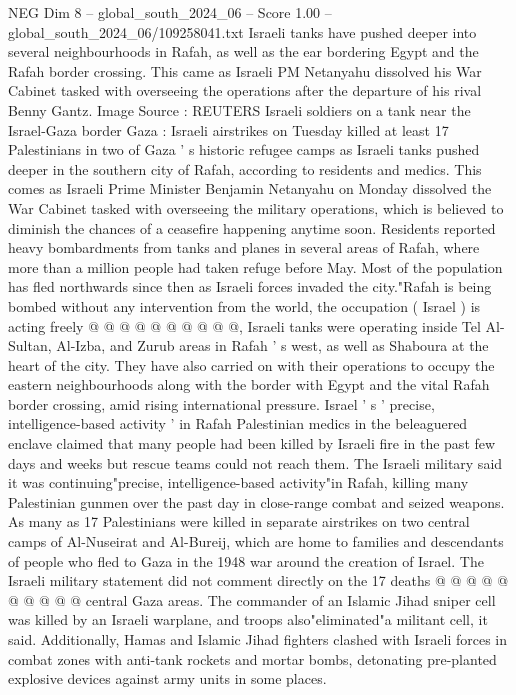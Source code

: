 \begin{textsample}{NEG Dim 8 – global\_south\_2024\_06 – Score 1.00 – global\_south\_2024\_06/109258041.txt}  \label{ex:f8_neg_250}
Israeli tanks have pushed deeper into several neighbourhoods in Rafah, as well as the ear bordering Egypt and the Rafah border crossing.
This came as Israeli PM Netanyahu dissolved his War Cabinet tasked with overseeing the operations after the departure of his rival Benny Gantz.
Image Source : REUTERS Israeli soldiers on a tank near the Israel-Gaza border Gaza : Israeli airstrikes on Tuesday killed at least 17 Palestinians in two of Gaza ' s historic refugee camps as Israeli tanks pushed deeper in the southern city of Rafah, according to residents and medics.
This comes as Israeli Prime Minister Benjamin Netanyahu on Monday dissolved the War Cabinet tasked with overseeing the military operations, which is believed to diminish the chances of a ceasefire happening anytime soon.
Residents reported heavy bombardments from tanks and planes in several areas of Rafah, where more than a million people had taken refuge before May.
Most of the population has fled northwards since then as Israeli forces invaded the city."Rafah is being bombed without any intervention from the world, the occupation ( Israel ) is acting freely @ @ @ @ @ @ @ @ @ @, Israeli tanks were operating inside Tel Al-Sultan, Al-Izba, and Zurub areas in Rafah ' s west, as well as Shaboura at the heart of the city.
They have also carried on with their operations to occupy the eastern neighbourhoods along with the border with Egypt and the vital Rafah border crossing, amid rising international pressure.
Israel ' s ' precise, intelligence-based activity ' in Rafah Palestinian medics in the beleaguered enclave claimed that many people had been killed by Israeli fire in the past few days and weeks but rescue teams could not reach them.
The Israeli military said it was continuing"precise, intelligence-based activity"in Rafah, killing many Palestinian gunmen over the past day in close-range combat and seized weapons.
As many as 17 Palestinians were killed in separate airstrikes on two central camps of Al-Nuseirat and Al-Bureij, which are home to families and descendants of people who fled to Gaza in the 1948 war around the creation of Israel.
The Israeli military statement did not comment directly on the 17 deaths @ @ @ @ @ @ @ @ @ @ central Gaza areas.
The commander of an Islamic Jihad sniper cell was killed by an Israeli warplane, and troops also"eliminated"a militant cell, it said.
Additionally, Hamas and Islamic Jihad fighters clashed with Israeli forces in combat zones with anti-tank rockets and mortar bombs, detonating pre-planted explosive devices against army units in some places.

\end{textsample}
